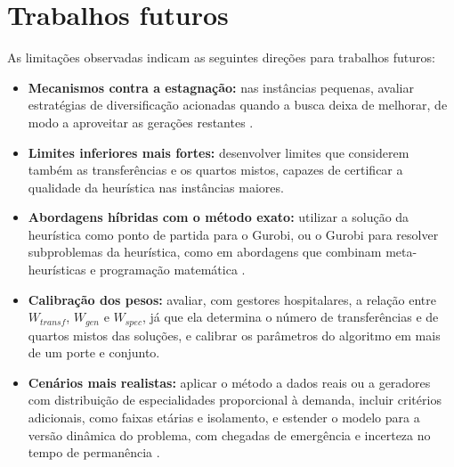 \section{Trabalhos futuros}

As limitações observadas indicam as seguintes direções para trabalhos futuros:

\begin{itemize}
    \item \textbf{Mecanismos contra a estagnação:} nas instâncias pequenas, avaliar estratégias de diversificação acionadas quando a busca deixa de melhorar, de modo a aproveitar as gerações restantes \cite{talbi2009metaheuristics}.
    \item \textbf{Limites inferiores mais fortes:} desenvolver limites que considerem também as transferências e os quartos mistos, capazes de certificar a qualidade da heurística nas instâncias maiores.
    \item \textbf{Abordagens híbridas com o método exato:} utilizar a solução da heurística como ponto de partida para o Gurobi, ou o Gurobi para resolver subproblemas da heurística, como em abordagens que combinam meta-heurísticas e programação matemática \cite{belien2007building}.
    \item \textbf{Calibração dos pesos:} avaliar, com gestores hospitalares, a relação entre $W_{transf}$, $W_{gen}$ e $W_{spec}$, já que ela determina o número de transferências e de quartos mistos das soluções, e calibrar os parâmetros do algoritmo em mais de um porte e conjunto.
    \item \textbf{Cenários mais realistas:} aplicar o método a dados reais ou a geradores com distribuição de especialidades proporcional à demanda, incluir critérios adicionais, como faixas etárias e isolamento, e estender o modelo para a versão dinâmica do problema, com chegadas de emergência e incerteza no tempo de permanência \cite{ceschia2012modeling, schafer2023combining}.
\end{itemize}
